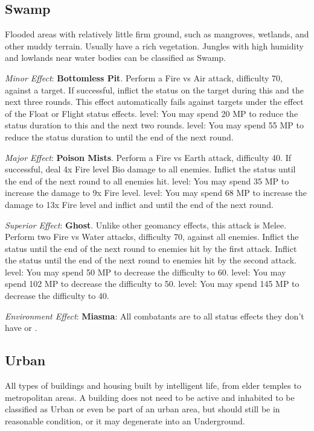 \begin{multicols}{2}
\subsection*{Swamp}\label{subsec:geo-swamp}
Flooded areas with relatively little firm ground, such as mangroves, wetlands, and other muddy terrain. Usually have a rich vegetation. Jungles with high humidity and lowlands near water bodies can be classified as Swamp.

\textit{Minor Effect}: \textbf{Bottomless Pit}. Perform a Fire vs Air attack, difficulty 70, against a target. If successful, inflict the  status on the target during this and the next three rounds. This effect automatically fails against targets under the effect of the Float or Flight status effects.  level: You may spend 20 MP to reduce the status duration to this and the next two rounds.  level: You may spend 55 MP to reduce the status duration to until the end of the next round.

\textit{Major Effect}: \textbf{Poison Mists}. Perform a Fire vs Earth attack, difficulty 40. If successful, deal 4x Fire level Bio damage to all enemies. Inflict the  status until the end of the next round to all enemies hit.  level: You may spend 35 MP to increase the damage to 9x Fire level.  level: You may spend 68 MP to increase the damage to 13x Fire level and inflict  and  until the end of the next round.

\textit{Superior Effect}: \textbf{Ghost}. Unlike other geomancy effects, this attack is Melee. Perform two Fire vs Water attacks, difficulty 70, against all enemies. Inflict the  status until the end of the next round to enemies hit by the first attack. Inflict the  status until the end of the next round to enemies hit by the second attack.  level: You may spend 50 MP to decrease the difficulty to 60.  level: You may spend 102 MP to decrease the difficulty to 50.  level: You may spend 145 MP to decrease the difficulty to 40.

\textit{Environment Effect}: \textbf{Miasma}: All combatants are  to all status effects they don't have  or .

\subsection*{Urban}\label{subsec:geo-urban}
All types of buildings and housing built by intelligent life, from elder temples to metropolitan areas. A building does not need to be active and inhabited to be classified as Urban or even be part of an urban area, but should still be in reasonable condition, or it may degenerate into an Underground.


\end{multicols}
